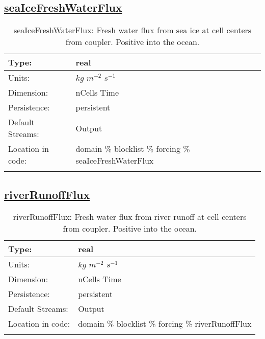 \subsection[seaIceFreshWaterFlux]{\hyperref[sec:var_tab_forcing]{seaIceFreshWaterFlux}}
\label{subsec:var_sec_forcing_seaIceFreshWaterFlux}
\begin{center}
\begin{longtable}{| p{2.0in} | p{4.0in} |}
        \hline 
        Type: & real \\
        \hline 
        Units: & $kg$ $m^{-2}$ $s^{-1}$ \\
        \hline 
        Dimension: & nCells Time \\
        \hline 
        Persistence: & persistent \\
        \hline 
		 Default Streams: & Output  \\
        \hline 
		 Location in code: & domain \% blocklist \% forcing \% seaIceFreshWaterFlux \\
		 \hline 
    \caption{seaIceFreshWaterFlux: Fresh water flux from sea ice at cell centers from coupler. Positive into the ocean.}
\end{longtable}
\end{center}
\subsection[riverRunoffFlux]{\hyperref[sec:var_tab_forcing]{riverRunoffFlux}}
\label{subsec:var_sec_forcing_riverRunoffFlux}
\begin{center}
\begin{longtable}{| p{2.0in} | p{4.0in} |}
        \hline 
        Type: & real \\
        \hline 
        Units: & $kg$ $m^{-2}$ $s^{-1}$ \\
        \hline 
        Dimension: & nCells Time \\
        \hline 
        Persistence: & persistent \\
        \hline 
		 Default Streams: & Output  \\
        \hline 
		 Location in code: & domain \% blocklist \% forcing \% riverRunoffFlux \\
		 \hline 
    \caption{riverRunoffFlux: Fresh water flux from river runoff at cell centers from coupler. Positive into the ocean.}
\end{longtable}
\end{center}
